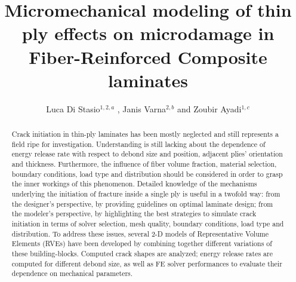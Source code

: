 \documentclass[a4paper]{jpconf}
\begin{document}

\title{Micromechanical modeling of thin ply effects on microdamage in Fiber-Reinforced Composite laminates}

\author{Luca Di Stasio$^{1,2,a}$ , Janis Varna$^{2,b}$ and Zoubir Ayadi$^{1,c}$ }

\address{$^{1}$SI2M, IJL, EEIGM, Universit\'e de Lorraine, 6 Rue Bastien Lepage, F-54010 Nancy, France\\$^{2}$Division of Polymer Engineering, Lule\aa\ University of Technology, SE-97187 Lule\aa , Sweden }

{\vspace*{5pt}\address{E-mail: $^{a}$luca.di-stasio@univ-lorraine.fr, $^{b}$janis.varna@ltu.se, $^{c}$zoubir.ayadi@univ-lorraine.fr}}


\begin{abstract}
Crack initiation in thin-ply laminates has been mostly neglected and still represents a field ripe for investigation. Understanding is still lacking about the dependence of energy release rate with respect to debond size and position, adjacent plies’ orientation and thickness. Furthermore, the influence of fiber volume fraction, material selection, boundary conditions, load type and distribution should be considered in order to grasp the inner workings of this phenomenon. Detailed knowledge of the mechanisms underlying the initiation of fracture inside a single ply is useful in a twofold way: from the designer’s perspective, by providing guidelines on optimal laminate design; from the modeler’s perspective, by highlighting the best strategies to simulate crack initiation in terms of solver selection, mesh quality, boundary conditions, load type and distribution. To address these issues, several 2-D models of Representative Volume Elements (RVEs) have been developed by combining together different variations of these building-blocks. Computed crack shapes are analyzed; energy release rates are computed for different debond size, as well as FE solver performances to evaluate their dependence on mechanical parameters.
\end{abstract}
\end{document}
